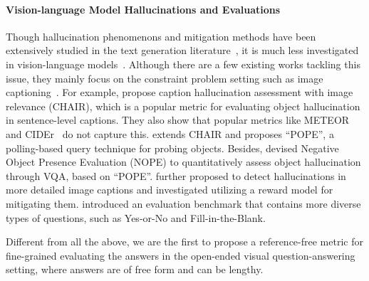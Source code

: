 

\paragraph{Vision-language Model Hallucinations and Evaluations}
Though hallucination phenomenons and mitigation methods have been extensively studied in the text generation literature~\cite{ji2023survey, factscore}, it is much less investigated in vision-language models~\cite{InstructBLIP, llava,fgaif,mmss}.
% 
Although there are a few existing works tackling this issue, they mainly focus on the constraint problem setting such as image captioning~\cite{densecap}.
For example, 
\citet{DBLP:conf/emnlp/RohrbachHBDS18} propose caption hallucination assessment with image relevance (CHAIR), which is a popular metric for evaluating object hallucination in sentence-level captions. They also show that popular metrics like METEOR~\cite{meteor} and CIDEr~\cite{vedantam2015cider} do not capture this. 
\citet{Li2023EvaluatingOH} extends CHAIR and proposes ``POPE'', a polling-based query technique for probing objects. Besides, \citet{lovenia2023negative} devised Negative Object Presence Evaluation (NOPE) to quantitatively assess object hallucination through VQA, based on ``POPE''. 
\citet{gunjal2023detecting} further proposed to detect hallucinations in more detailed image captions and investigated utilizing a reward model for mitigating them. \citet{DBLP:journals/corr/abs-2309-04041} introduced an evaluation benchmark that contains more diverse types of questions, such as Yes-or-No and Fill-in-the-Blank. 

Different from all the above, we are the first to propose a \textcolor[rgb]{0,0,0}{reference-free} metric for \textcolor[rgb]{0,0,0}{fine-grained} evaluating the answers in the \textcolor[rgb]{0,0,0}{open-ended visual question-answering setting}, where answers are of free form and can be lengthy.


